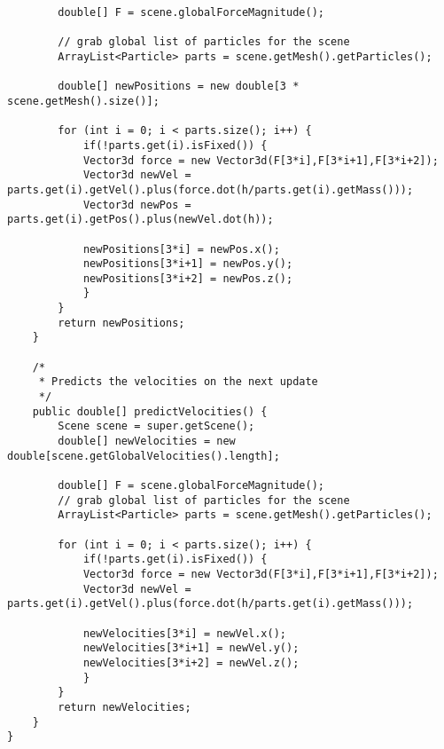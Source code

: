 \begin{lstlisting}
		double[] F = scene.globalForceMagnitude();
		
		// grab global list of particles for the scene
		ArrayList<Particle> parts = scene.getMesh().getParticles();
		
		double[] newPositions = new double[3 * scene.getMesh().size()];

		for (int i = 0; i < parts.size(); i++) {
			if(!parts.get(i).isFixed()) {
			Vector3d force = new Vector3d(F[3*i],F[3*i+1],F[3*i+2]);
			Vector3d newVel = parts.get(i).getVel().plus(force.dot(h/parts.get(i).getMass()));
			Vector3d newPos = parts.get(i).getPos().plus(newVel.dot(h));
			
			newPositions[3*i] = newPos.x();
			newPositions[3*i+1] = newPos.y();
			newPositions[3*i+2] = newPos.z();
			}
		}
		return newPositions;
    }
	
    /*
	 * Predicts the velocities on the next update
	 */
    public double[] predictVelocities() {
		Scene scene = super.getScene();
		double[] newVelocities = new double[scene.getGlobalVelocities().length];

		double[] F = scene.globalForceMagnitude();
		// grab global list of particles for the scene
		ArrayList<Particle> parts = scene.getMesh().getParticles();
		
		for (int i = 0; i < parts.size(); i++) {
			if(!parts.get(i).isFixed()) {
			Vector3d force = new Vector3d(F[3*i],F[3*i+1],F[3*i+2]);
			Vector3d newVel = parts.get(i).getVel().plus(force.dot(h/parts.get(i).getMass()));
			
			newVelocities[3*i] = newVel.x();
			newVelocities[3*i+1] = newVel.y();
			newVelocities[3*i+2] = newVel.z();
			}
		}
		return newVelocities;
    }
}\end{lstlisting}

